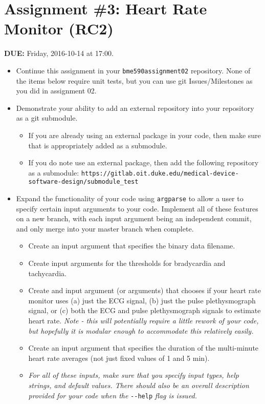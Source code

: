 


\section*{Assignment \#3: Heart Rate Monitor (RC2)}

{\bf DUE:} Friday, 2016-10-14 at 17:00.

\begin{itemize}

\item Continue this assignment in your \verb+bme590assignment02+ repository.  None of the items below require unit tests, but you can use git Issues/Milestones as you did in assignment 02.

\item Demonstrate your ability to add an external repository into your repository as a git submodule.  
\begin{itemize}
    \item If you are already using an external package in your code, then make sure that is appropriately added as a submodule.  
    \item If you do note use an external package, then add the following repository as a submodule: \verb+https://gitlab.oit.duke.edu/medical-device-software-design/submodule_test+
\end{itemize}

\item Expand the functionality of your code using \verb+argparse+ to allow a user to specify certain input arguments to your code.  Implement all of these features on a new branch, with each input argument being an independent commit, and only merge into your master branch when complete.
\begin{itemize}
    \item Create an input argument that specifies the binary data filename.
    \item Create input arguments for the thresholds for bradycardia and tachycardia.
    \item Create and input argument (or arguments) that chooses if your heart rate monitor uses (a) just the ECG signal, (b) just the pulse plethysmograph signal, or (c) both the ECG and pulse plethysmograph signals to estimate heart rate.  \emph{Note - this will potentially require a little rework of your code, but hopefully it is modular enough to accommodate this relatively easily.}
    \item Create an input argument that specifies the duration of the multi-minute heart rate averages (not just fixed values of 1 and 5 min).
    \item \emph{For all of these inputs, make sure that you specify input types, help strings, and default values.  There should also be an overall description provided for your code when the} \verb+--help+ \emph{flag is issued.}
\end{itemize}


\end{itemize}
